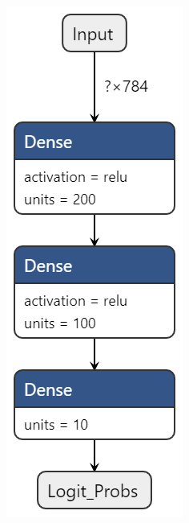 \documentclass[11pt]{article}
\begin{document}
\begin{figure}[H]
\begin{subfigure}[c]{0.24\textwidth}
        \caption{}
        \label{fig:DNN1}
    \end{subfigure}
    \begin{subfigure}[c]{0.24\textwidth}
        \centering
        \includegraphics[width = \textwidth]{normal2.png}

\end{subfigure}
\end{figure}
\end{document}
